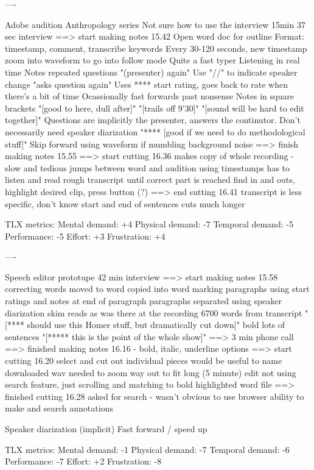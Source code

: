 ----

Adobe audition
Anthropology series
Not sure how to use the interview
15min 37 sec interview
==> start making notes 15.42
Open word doc for outline
Format: timestamp, comment, transcribe keywords
Every 30-120 seconds, new timestamp
zoom into waveform to go into follow mode
Quite a fast typer
Listening in real time
Notes repeated questions "(presenter) again"
Use "//" to indicate speaker change
"asks question again"
Uses **** start rating, goes back to rate when there's a bit of time
Ocassionally fast forwards past nonsense
Notes in square brackets
"[good to here, dull after]"
"[trails off 9'30]"
"[sound will be hard to edit together]"
Questions are implicitly the presenter, answers the continutor. Don't
necessarily need speaker diarization
"**** [good if we need to do methodological stuff]"
Skip forward using waveform if mumbling background noise
==> finish making notes 15.55
==> start cutting 16.36
makes copy of whole recording - slow and tedious
jumps between word and audition using timestamps
has to listen and read rough transcript until correct part is reached
find in and outs, highlight desired clip, press button (?)
==> end sutting 16.41
transcript is less specific, don't know start and end of sentences
cuts much longer

TLX metrics:
Mental demand: +4
Physical demand: -7
Temporal demand: -5
Performance: -5
Effort: +3
Frustration: +4

----

Speech editor prototupe
42 min interview
==> start making notes 15.58
correcting words
moved to word
copied into word
marking paragraphs using start ratings and notes at end of paragraph
paragraphs separated using speaker diarization
skim reads as was there at the recording
6700 words from transcript
"[**** should use this Homer stuff, but dramatically cut down]"
bold lots of sentences
"[***** this is the point of the whole show]"
==> 3 min phone call
==> finished making notes 16.16
- bold, italic, underline options
==> start cutting 16.20
select and cut out individual pieces
would be useful to name downloaded wav
needed to zoom way out to fit long (5 minute) edit
not using search feature, just scrolling and matching to bold highlighted word
file
==> finished cutting 16.28
asked for search - wasn't obvious to use browser
ability to make and search annotations

Speaker diarization (implicit)
Fast forward / speed up

TLX metrics:
Mental demand: -1
Physical demand: -7
Temporal demand: -6
Performance: -7
Effort: +2
Frustration: -8

